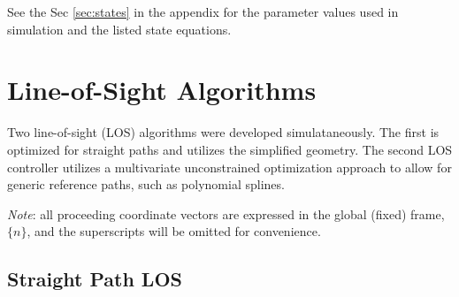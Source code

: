 \documentclass[conference]{IEEEtran}
\begin{document}
See the Sec \ref{sec:states} in the appendix for the parameter values used in simulation and the listed state equations. 




\section{Line-of-Sight Algorithms}\label{sec:los}
Two line-of-sight (LOS) algorithms were developed simulataneously. The first is optimized for straight paths and utilizes the simplified geometry. The second LOS controller utilizes a multivariate unconstrained optimization approach to allow for generic reference paths, such as polynomial splines.

\textit{Note}: all proceeding coordinate vectors are expressed in the global (fixed) frame, $\{n\}$, and the superscripts will be omitted for convenience.

\subsection{Straight Path LOS} %
\label{sub:straight_path_los}
\end{document}
